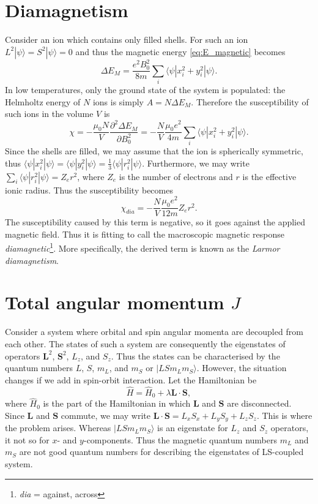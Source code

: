 \section{Diamagnetism}
Consider an ion which contains only filled shells. For such an ion $L^2|\psi\rangle = S^2|\psi\rangle = 0$ and thus the magnetic energy \eqref{eq:E_magnetic} becomes
\begin{equation}
\Delta E_M = \frac{e^2 B_0^2}{8 m}\sum_i \langle \psi | x_i^2 + y_i^2 | \psi \rangle.
\end{equation}
In low temperatures, only the ground state of the system is populated: the Helmholtz energy of $N$ ions is simply $A = N\Delta E_M$. Therefore the susceptibility of such ions in the volume $V$ is
\begin{equation}
\chi = -\frac{\mu_0 N}{V} \frac{\partial^2 \Delta E_M}{\partial B_0^2}
= -\frac{N}{V} \frac{\mu_0 e^2}{4 m}\sum_i \langle \psi | x_i^2 + y_i^2 | \psi \rangle.
\end{equation}
Since the shells are filled, we may assume that the ion is spherically symmetric, thus $\langle \psi | x_i^2| \psi \rangle = \langle \psi | y_i^2 | \psi \rangle = \frac{1}{3} \langle \psi | r_i^2| \psi \rangle $. Furthermore, we may write $\sum_i \langle \psi | r_i^2| \psi \rangle = Z_{e} r^2$, where $Z_{e}$ is the number of electrons and $r$ is the effective ionic radius. Thus the susceptibility becomes
\begin{equation}
\chi_{dia} =  -\frac{N}{V} \frac{\mu_0  e^2}{12 m} Z_{e} r^2.
\end{equation}
The susceptibility caused by this term is negative, so it goes against the applied magnetic field. Thus it is fitting to call the macroscopic magnetic response \emph{diamagnetic}\footnote{\emph{dia} = against, across}. More specifically, the derived term is known as the \emph{Larmor diamagnetism}.


\section{Total angular momentum $J$}

Consider a system where orbital and spin angular momenta are decoupled from each other. The states of such a system are consequently the eigenstates of operators $\mathbf{L}^2$, $\mathbf{S}^2$, $L_z$, and  $S_z$. Thus the states can be characterised by the quantum numbers $L$, $S$, $m_L$, and $m_S$  or $|LSm_Lm_S\rangle$. However, the situation changes if we add in spin-orbit interaction. Let the Hamiltonian be 
\begin{equation}
\hat{H} = \hat{H}_0 + \lambda \mathbf{L} \cdot \mathbf{S},
\end{equation}
where $\hat{H}_0$ is the part of the Hamiltonian in which $\mathbf{L}$ and $\mathbf{S}$ are disconnected. Since $\mathbf{L}$ and $\mathbf{S}$ commute, we may write $\mathbf{L} \cdot \mathbf{S} = L_x S_x + L_y S_y + L_z S_z$. This is where the problem arises. Whereas $|LSm_Lm_S\rangle$ is an eigenstate for $L_z$ and $S_z$ operators, it not so for $x$- and $y$-components. Thus the magnetic quantum numbers $m_L$ and $m_S$ are not good quantum numbers for describing the eigenstates of LS-coupled system.

